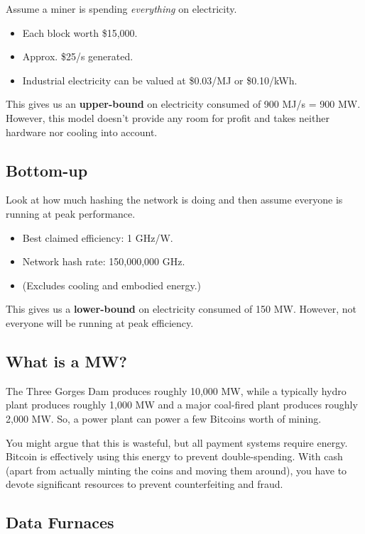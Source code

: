 \documentclass[12pt]{article}
\begin{document}
Assume a miner is spending \textit{everything} on electricity.

\begin{itemize}
\item Each block worth \$15,000.
\item Approx. \$25/s generated.
\item Industrial electricity can be valued at \$0.03/MJ or \$0.10/kWh.
\end{itemize}

This gives us an \textbf{upper-bound} on electricity consumed of 900 MJ/s = 900 MW. However, this model doesn't provide any room for profit and takes neither hardware nor cooling into account.

\subsection*{Bottom-up}

Look at how much hashing the network is doing and then assume everyone is running at peak performance.

\begin{itemize}
\item Best claimed efficiency: 1 GHz/W.
\item Network hash rate: 150,000,000 GHz.
\item (Excludes cooling and embodied energy.)
\end{itemize}

This gives us a \textbf{lower-bound} on electricity consumed of 150 MW. However, not everyone will be running at peak efficiency.

\subsection*{What is a MW?}

The Three Gorges Dam produces roughly 10,000 MW, while a typically hydro plant produces roughly 1,000 MW and a major coal-fired plant produces roughly 2,000 MW. So, a power plant can power a few Bitcoins worth of mining.

You might argue that this is wasteful, but all payment systems require energy. Bitcoin is effectively using this energy to prevent double-spending. With cash (apart from actually minting the coins and moving them around), you have to devote significant resources to prevent counterfeiting and fraud.

\subsection*{Data Furnaces}
\end{document}

